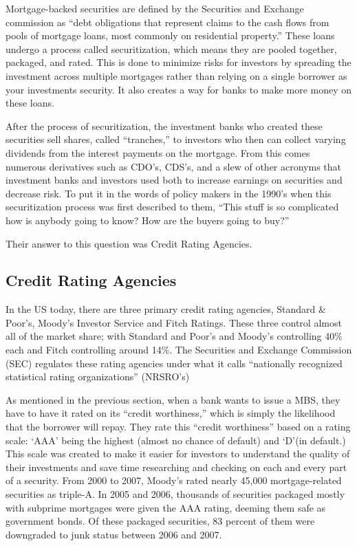 \documentclass[11pt]{article}
\begin{document}
\begin{multicols}{2}
Mortgage-backed securities are defined by the Securities and Exchange commission as ``debt obligations that represent claims to the cash flows from pools of mortgage loans, most commonly on residential property.'' \cite{secMBS} These loans undergo a process called securitization, which means they are pooled together, packaged, and rated.  This is done to minimize risks for investors by spreading the investment across multiple mortgages rather than relying on a single borrower as your investments security.  It also creates a way for banks to make more money on these loans.  


After the process of securitization, the investment banks who created these securities sell shares, called ``tranches,'' to investors who then can collect varying dividends from the interest payments on the mortgage.  From this comes numerous derivatives such as CDO's, CDS's, and a slew of other acronyms that investment banks and investors used both to increase earnings on securities and decrease risk.  To put it in the words of policy makers in the 1990's when this securitization process was first described to them, ``This stuff is so complicated how is anybody going to know? How are the buyers going to buy?'' \cite[p.~68]{govtReport}  


Their answer to this question was Credit Rating Agencies.

\subsection{Credit Rating Agencies}
In the US today, there are three primary credit rating agencies, Standard \& Poor's, Moody's Investor Service and Fitch Ratings.  These three control almost all of the market share; with Standard and Poor's and Moody's controlling 40\% each and Fitch controlling around 14\%. \cite{wpMoodies}  The Securities and Exchange Commission (SEC) regulates these rating agencies under what it calls ``nationally recognized statistical rating organizations'' (NRSRO's) \cite{CivilLiability} 

As mentioned in the previous section, when a bank wants to issue a MBS, they have to have it rated on its ``credit worthiness,'' which is simply the likelihood that the borrower will repay.  They rate this ``credit worthiness'' based on a rating scale: `AAA' being the highest (almost no chance of default) and `D'(in default.)  \cite{CivilLiability}  This scale was created to make it easier for investors to understand the quality of their investments and save time researching and checking on each and every part of a security.  From 2000 to 2007, Moody's rated nearly 45,000 mortgage-related securities as triple-A. \cite[p.~xxv]{govtReport} In 2005 and 2006, thousands of securities packaged mostly with subprime mortgages were given the AAA rating, deeming them safe as government bonds.  Of these packaged securities, 83 percent of them were downgraded to junk status between 2006 and 2007. \cite[p.~xxv]{govtReport}\cite{ratingEthics}  


\end{multicols}
\end{document}
